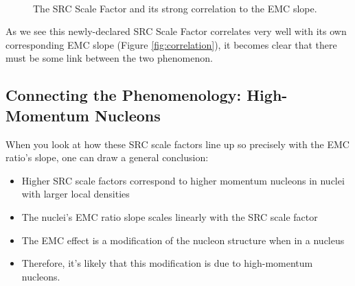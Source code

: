 \documentclass[11pt]{article}
\begin{document}
\begin{figure}
\centering
\mbox{
	\quad
}
\caption{The SRC Scale Factor and its strong correlation to the EMC slope.}
\label{fig:src_emc}
\end{figure}

As we see this newly-declared SRC Scale Factor correlates very well with its own corresponding EMC slope (Figure \ref{fig:correlation}), it becomes clear that there must be some link between the two phenomenon.

\subsection{Connecting the Phenomenology: High-Momentum Nucleons}

When you look at how these SRC scale factors line up so precisely with the EMC ratio's slope, one can draw a general conclusion:
\begin{itemize}
\item
Higher SRC scale factors correspond to higher momentum nucleons in nuclei with larger local densities
\item
 The nuclei's EMC ratio slope scales linearly with the SRC scale factor
\item
The EMC effect is a modification of the nucleon structure when in a nucleus
\item
Therefore, it's likely that this modification is due to high-momentum nucleons.
\end{itemize}
\end{document}
